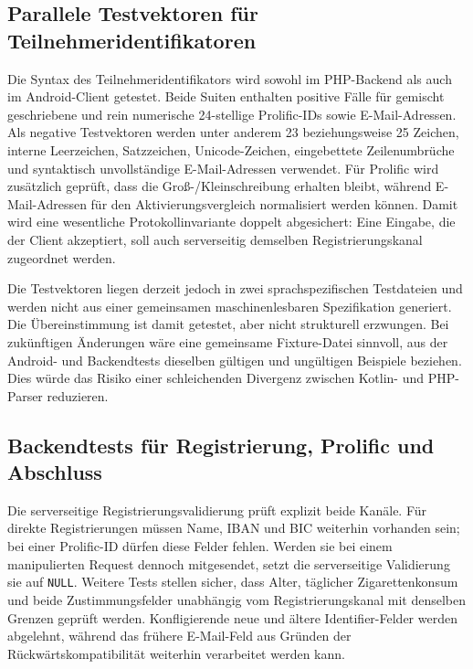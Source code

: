 \begin{neu}
\subsection{Parallele Testvektoren für Teilnehmeridentifikatoren}

Die Syntax des Teilnehmeridentifikators wird sowohl im PHP-Backend als auch im Android-Client getestet. Beide Suiten enthalten positive Fälle für gemischt geschriebene und rein numerische 24-stellige Prolific-IDs sowie E-Mail-Adressen. Als negative Testvektoren werden unter anderem 23 beziehungsweise 25 Zeichen, interne Leerzeichen, Satzzeichen, Unicode-Zeichen, eingebettete Zeilenumbrüche und syntaktisch unvollständige E-Mail-Adressen verwendet. Für Prolific wird zusätzlich geprüft, dass die Groß-/Kleinschreibung erhalten bleibt, während E-Mail-Adressen für den Aktivierungsvergleich normalisiert werden können. Damit wird eine wesentliche Protokollinvariante doppelt abgesichert: Eine Eingabe, die der Client akzeptiert, soll auch serverseitig demselben Registrierungskanal zugeordnet werden.

Die Testvektoren liegen derzeit jedoch in zwei sprachspezifischen Testdateien und werden nicht aus einer gemeinsamen maschinenlesbaren Spezifikation generiert. Die Übereinstimmung ist damit getestet, aber nicht strukturell erzwungen. Bei zukünftigen Änderungen wäre eine gemeinsame Fixture-Datei sinnvoll, aus der Android- und Backendtests dieselben gültigen und ungültigen Beispiele beziehen. Dies würde das Risiko einer schleichenden Divergenz zwischen Kotlin- und PHP-Parser reduzieren.

\subsection{Backendtests für Registrierung, Prolific und Abschluss}

Die serverseitige Registrierungsvalidierung prüft explizit beide Kanäle. Für direkte Registrierungen müssen Name, IBAN und BIC weiterhin vorhanden sein; bei einer Prolific-ID dürfen diese Felder fehlen. Werden sie bei einem manipulierten Request dennoch mitgesendet, setzt die serverseitige Validierung sie auf \texttt{NULL}. Weitere Tests stellen sicher, dass Alter, täglicher Zigarettenkonsum und beide Zustimmungsfelder unabhängig vom Registrierungskanal mit denselben Grenzen geprüft werden. Konfligierende neue und ältere Identifier-Felder werden abgelehnt, während das frühere E-Mail-Feld aus Gründen der Rückwärtskompatibilität weiterhin verarbeitet werden kann.


\end{neu}
